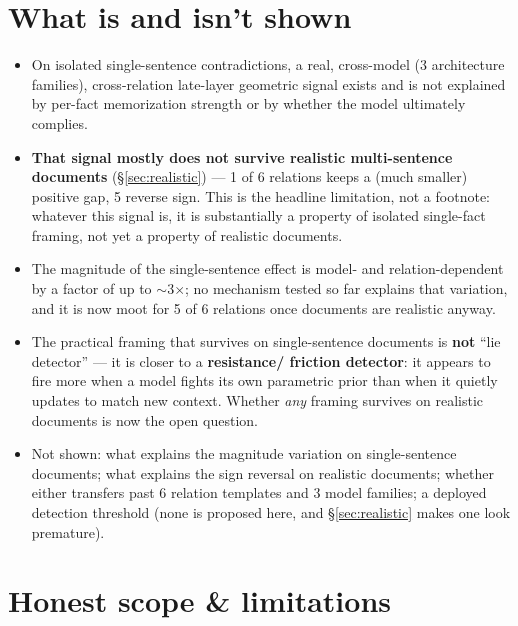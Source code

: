 \documentclass[11pt]{article}
\begin{document}
\section{What is and isn't shown}

\begin{itemize}
\item On isolated single-sentence contradictions, a real, cross-model (3
  architecture families), cross-relation late-layer geometric signal exists
  and is not explained by per-fact memorization strength or by whether the
  model ultimately complies.
\item \textbf{That signal mostly does not survive realistic multi-sentence
  documents} (\S\ref{sec:realistic}) --- 1 of 6 relations keeps a (much
  smaller) positive gap, 5 reverse sign. This is the headline limitation, not
  a footnote: whatever this signal is, it is substantially a property of
  isolated single-fact framing, not yet a property of realistic documents.
\item The magnitude of the single-sentence effect is model- and
  relation-dependent by a factor of up to $\sim$3$\times$; no mechanism
  tested so far explains that variation, and it is now moot for 5 of 6
  relations once documents are realistic anyway.
\item The practical framing that survives on single-sentence documents is
  \textbf{not} ``lie detector'' --- it is closer to a \textbf{resistance/
  friction detector}: it appears to fire more when a model fights its own
  parametric prior than when it quietly updates to match new context.
  Whether \emph{any} framing survives on realistic documents is now the open
  question.
\item Not shown: what explains the magnitude variation on single-sentence
  documents; what explains the sign reversal on realistic documents; whether
  either transfers past 6 relation templates and 3 model families; a
  deployed detection threshold (none is proposed here, and
  \S\ref{sec:realistic} makes one look premature).
\end{itemize}

\section{Honest scope \& limitations}
\label{sec:limitations}
\end{document}

